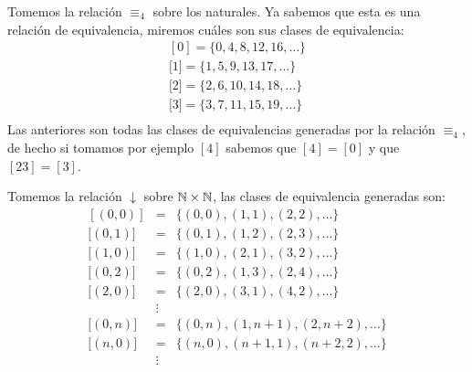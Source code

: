 \begin{ejemplo}
Tomemos la relación $\equiv_4$ sobre los naturales.
Ya sabemos que esta es una relación de equivalencia, miremos cuáles son sus clases de equivalencia:
\[
\begin{array}{l}
[0]=\{0,4,8,12,16,\ldots\} \\
\text{[}1]=\{1,5,9,13,17,\ldots\} \\
\text{[}2]=\{2,6,10,14,18,\ldots\} \\
\text{[}3]=\{3,7,11,15,19,\ldots\} \\
\end{array}
\]
Las anteriores son todas las clases de equivalencias generadas por la relación $\equiv_4$, de hecho si tomamos por ejemplo $[4]$ sabemos que $[4]=[0]$ y que $[23]=[3]$.
\end{ejemplo}

\begin{ejemplo}
Tomemos la relación $\downarrow$ sobre $\mathbb{N}\times\mathbb{N}$, las clases de equivalencia generadas son:
\[
\begin{array}{rcl}
[(0,0)]& = &\{(0,0),(1,1),(2,2),\ldots\} \\
\text{[}(0,1)]& = &\{(0,1),(1,2),(2,3),\ldots\} \\%
\text{[}(1,0)]& = &\{(1,0),(2,1),(3,2),\ldots\} \\%
\text{[}(0,2)]& = &\{(0,2),(1,3),(2,4),\ldots\} \\%
\text{[}(2,0)]& = &\{(2,0),(3,1),(4,2),\ldots\} \\%
&\vdots\\
\text{[}(0,n)]& = &\{(0,n),(1,n+1),(2,n+2),\ldots\} \\%
\text{[}(n,0)]& = &\{(n,0),(n+1,1),(n+2,2),\ldots\} \\%
&\vdots
\end{array}
\]
\vspace*{-25pt}
\end{ejemplo}


